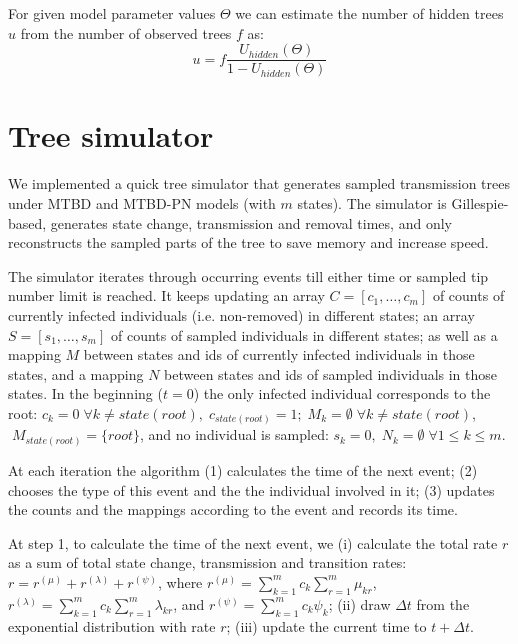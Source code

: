 \documentclass[a4paper,10pt]{article}
\begin{document}
For given model parameter values $\Theta$ we can estimate the number of hidden trees $u$ from the number of observed trees $f$ as:
\begin{equation}
u = f \frac{U_{hidden}(\Theta)}{1 - U_{hidden}(\Theta)}\label{eq:u} 
\end{equation}



\section{Tree simulator}
We implemented a quick tree simulator that generates sampled transmission trees under MTBD and MTBD-PN models (with $m$ states). The simulator is Gillespie-based, generates state change, transmission and removal times, and only reconstructs the sampled parts of the tree to save memory and increase speed. 

The simulator iterates through occurring events till either time or sampled tip number limit is reached. 
It keeps updating an array $C = [c_1, \ldots, c_m]$ of counts of currently infected individuals (i.e. non-removed) in different states; an array $S = [s_1, \ldots, s_m]$ of counts of sampled individuals in different states; as well as a mapping $M$ between states and ids of currently infected individuals in those states, and a mapping $N$ between states and ids of sampled individuals in those states.  In the beginning ($t=0$) the only infected individual corresponds to the root: $c_k = 0 \;\forall k \neq state(root), \;c_{state(root)} = 1; \;M_k = \emptyset \; \forall k \neq state(root)$, $ \; M_{state(root)} = \{root\}$, and no individual is sampled: $s_k=0,\;N_k = \emptyset \; \forall 1 \leq k \leq m$.

At each iteration the algorithm (1) calculates the time of the next event; (2) chooses the type of this event and the the individual involved in it; (3) updates the counts and the mappings according to the event and records its time.

At step 1, to calculate the time of the next event, we (i) calculate the total rate $r$ as a sum of total state change, transmission and transition rates: $r = r^{(\mu)} + r^{(\lambda)} + r^{(\psi)}$, where $r^{(\mu)} = \sum\limits_{k=1}^{m} c_k \sum\limits_{r=1}^{m} \mu_{kr}$, $r^{(\lambda)} = \sum\limits_{k=1}^{m} c_k \sum\limits_{r=1}^{m} \lambda_{kr}$, and $r^{(\psi)} = \sum\limits_{k=1}^{m} c_k \psi_{k}$; (ii) draw $\Delta t$ from the exponential distribution with rate $r$; (iii) update the current time to $t + \Delta t$.
\end{document}
